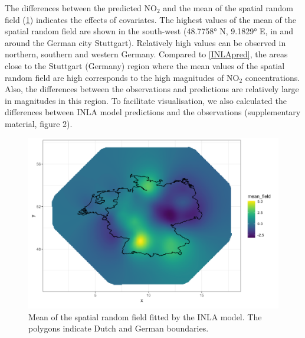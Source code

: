 \documentclass{article}
\begin{document}
The differences between the predicted NO$_2$ and the mean of the spatial random field (\cref{randomfield}) indicates the effects of covariates. The highest values of the mean of the spatial random field are shown in the south-west (48.7758° N, 9.1829° E, in and around the German city Stuttgart). Relatively high values can be observed in northern, southern and western Germany. Compared to \cref{INLApred}, the areas close to the Stuttgart (Germany) region where the mean values of the spatial random field are high corresponds to the high magnitudes of NO$_2$ concentrations. Also, the differences between the observations and predictions are relatively large in magnitudes in this region. To facilitate visualisation, we also calculated the differences between INLA model predictions and the observations  (supplementary material, figure 2).  

 
  

\begin{figure}[!htb]
\centering
\includegraphics[scale = 0.6]{fig/mean_randomfield.png}
\caption{Mean of the spatial random field fitted by the INLA model. The polygons indicate Dutch and German boundaries.}
\label{randomfield}
\end{figure}
\end{document}
